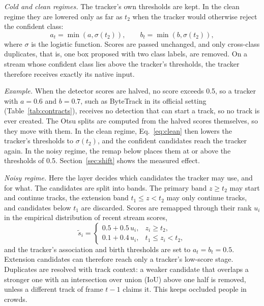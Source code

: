 \emph{Cold and clean regimes.} The tracker's own thresholds are kept. In the
clean regime they are lowered only as far as $t_2$ when the tracker would
otherwise reject the confident class:
\begin{equation}
a_t=\min\!\left(a,\sigma(t_2)\right),\qquad b_t=\min\!\left(b,\sigma(t_2)\right),
\label{eq:clean}
\end{equation}
where $\sigma$ is the logistic function. Scores are passed unchanged, and only
cross-class duplicates, that is, one box proposed with two class labels, are
removed. On a stream whose confident class lies above the tracker's
thresholds, the tracker therefore receives exactly its native input.

\emph{Example.} When the detector scores are halved, no score exceeds 0.5, so
a tracker with $a=0.6$ and $b=0.7$, such as ByteTrack in its official setting
(Table~\ref{tab:contracts}), receives no detection that can start a track,
so no track is ever created. The Otsu splits are computed from the halved scores themselves, so
they move with them. In the clean regime, Eq.~\eqref{eq:clean} then lowers
the tracker's thresholds to $\sigma(t_2)$, and the confident candidates reach
the tracker again. In the noisy regime, the remap below places them at or
above the thresholds of 0.5. Section~\ref{sec:shift} shows the measured effect.

\emph{Noisy regime.} Here the layer decides which candidates the tracker may
use, and for what. The candidates are split into bands. The primary band
$z\ge t_2$ may start and continue tracks, the extension band $t_1\le z<t_2$
may only continue tracks, and candidates below $t_1$ are discarded. Scores are
remapped through their rank $u_i$ in the empirical distribution of recent
stream scores,
\begin{equation}
\tilde{s}_i=
\begin{cases}
0.5+0.5\,u_i, & z_i\ge t_2,\\
0.1+0.4\,u_i, & t_1\le z_i<t_2,
\end{cases}
\label{eq:remap}
\end{equation}
and the tracker's association and birth thresholds are set to
$a_t=b_t=0.5$. Extension candidates can therefore reach only a tracker's
low-score stage. Duplicates are resolved with track context: a weaker
candidate that overlaps a stronger one with an intersection over union (IoU)
above one half is removed, unless a different track of frame $t-1$ claims it.
This keeps occluded people in crowds.

